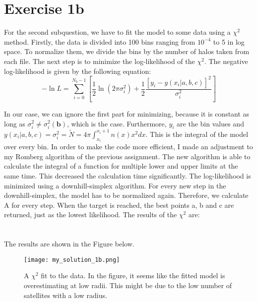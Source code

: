 \section{Exercise 1b}



For the second subquestion, we have to fit the model to some data using a $\chi^2$ method. Firstly, the data is divided into 100 bins ranging from $10^{-4}$ to 5 in log space. To normalize them, we divide the bins by the number of halos taken from each file. The next step is to minimize the log-likelihood of the $\chi^2$. The negative log-likelihood is given by the following equation: 
\begin{equation}
    -\ln{L} = \sum^{N_b-1}_{i = 0} \left[ \frac{1}{2} \ln(2\pi\sigma_i^2) +\frac{1}{2}\frac{[y_i - y(x_i|a,b,c)]^2}{\sigma_i^2}  \right]
\end{equation}

In our case, we can ignore the first part for minimizing, because it is constant as long as $\sigma_i^2 \neq \sigma_i^2(\textbf{b})$, which is the case. Furthermore, $y_i$ are the bin values and $y(x_i|a,b,c) = \sigma_i^2 = \tilde{N} = 4\pi\int^{x_i+1}_{x_i} n(x) x^2 dx$. This is the integral of the model over every bin. In order to make the code more efficient, I made an adjustment to my Romberg algorithm of the previous assignment. The new algorithm is able to calculate the integral of a function for multiple lower and upper limits at the same time. This decreased the calculation time significantly. The log-likelihood is minimized using a downhill-simplex algorithm. For every new step in the downhill-simplex, the model has to be normalized again. Therefore, we calculate A for every step. When the target is reached, the best points a, b and c are returned, just as the lowest likelihood. The results of the $\chi^2$ are: 
\\
\\

\\
The results are shown in the Figure below.

\begin{figure}[h!]
  \centering
  \texttt{[image: my\_solution\_1b.png]}
  \caption{A $\chi^2$ fit to the data. In the figure, it seems like the fitted model is overestimating at low radii. This might be due to the low number of satellites with a low radius.}
\end{figure}


